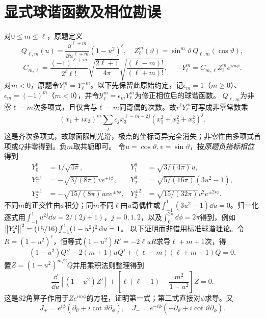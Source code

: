 \documentclass[UTF8,fontset=fandol,11pt]{ctexart}
\begin{document}
\section{显式球谐函数及相位勘误}
对$0\le m\le\ell$，原题定义
\[Q_{\ell,m}(u)=\frac{\dd^{\ell+m}}{\dd u^{\ell+m}}(1-u^2)^\ell,\quad Z_\ell^m(\vartheta)=\sin^m\vartheta\,Q_{\ell,m}(\cos\vartheta),\]
\[C_{m,\ell}=\frac{(-1)^{\ell+m}}{2^\ell\ell!}\sqrt{\frac{2\ell+1}{4\pi}}\sqrt{\frac{(\ell-m)!}{(\ell+m)!}},\qquad Y_\ell^m=C_{m,\ell}Z_\ell^m e^{im\phi}.\]
对$m<0$，原题令$Y_\ell^m=\overline{Y_\ell^{-m}}$。以下先保留此原始约定，记$\epsilon_m=1$（$m\ge0$）、$\epsilon_m=(-1)^m$（$m<0$），并令$\mathcal Y_\ell^m=\epsilon_mY_\ell^m$为修正相位后的球谐函数。
$Q_{\ell,m}$为非零$\ell-m$次多项式，且仅含与$\ell-m$同奇偶的次数。故$r^\ell Y_\ell^m$可写成非零常数乘
\[(x_1+ix_2)^m\sum_jc_jx_3^{\ell-m-2j}(x_1^2+x_2^2+x_3^2)^j.\]
这是齐次多项式，故球面限制光滑，极点的坐标奇异完全消失；非零性由多项式首项或$Q$非零得到。负$m$取共轭即可。
令$u=\cos\vartheta,v=\sin\vartheta$，按\emph{原题负指标相位}得到
\begin{align*}
Y_0^0&=1/\sqrt{4\pi},&Y_1^0&=\sqrt{3/(4\pi)}u,\\
Y_1^{\pm1}&=-\sqrt{3/(8\pi)}ve^{\pm i\phi},&Y_2^0&=\sqrt{5/(16\pi)}(3u^2-1),\\
Y_2^{\pm1}&=-\sqrt{15/(8\pi)}uve^{\pm i\phi},&Y_2^{\pm2}&=\sqrt{15/(32\pi)}v^2e^{\pm2i\phi}.
\end{align*}
不同$m$的正交性由$\phi$积分；同$m$不同$\ell$由$u$奇偶性或$\int_{-1}^1(3u^2-1)\dd u=0$。归一化逐式用$\int_{-1}^1u^{2j}\dd u=2/(2j+1)$，$j=0,1,2$，以及$\int_0^{2\pi}\dd\phi=2\pi$得到，例如$\left\lVert Y_2^2\right\rVert^2=(15/16)\int_{-1}^1(1-u^2)^2\,\mathrm d u=1$。
以下证明而非借用标准球谐理论。令$R=(1-u^2)^\ell$，恒等式$(1-u^2)R'=-2\ell uR$求导$\ell+m+1$次，得
\[(1-u^2)Q''-2(m+1)uQ'+(\ell-m)(\ell+m+1)Q=0.\]
置$Z=(1-u^2)^{m/2}Q$并用乘积法则整理得到
\[\frac\dd{\dd u}[(1-u^2)Z']+\left[\ell(\ell+1)-\frac{m^2}{1-u^2}\right]Z=0.\]
这是S2角算子作用于$Ze^{im\phi}$的方程，证明第一式；第二式直接对$\phi$求导。又
\[J_+=e^{i\phi}(\partial_\vartheta+i\cot\vartheta\partial_\phi),\quad J_-=e^{-i\phi}(-\partial_\vartheta+i\cot\vartheta\partial_\phi).\]
\end{document}
